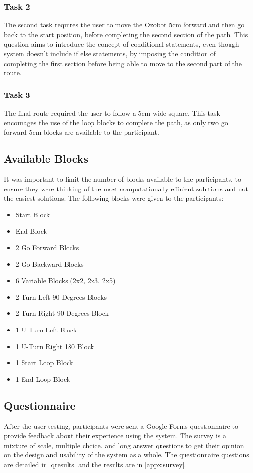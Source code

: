 \documentclass[oneside,%
                    author={Malak Hajji},
                    degree={BSc},
                    title={Designing An Accessible Ozobot Programming Platform for Students},
                  subtitle={With Mixed Visual Abilities}]{dissertation}
\begin{document}
\subsubsection{Task 2}
The second task requires the user to move the Ozobot 5cm forward and then go back to the start position, before completing the second section of the path. This question aims to introduce the concept of conditional statements, even though system doesn't include if else statements, by imposing the condition of completing the first section before being able to move to the second part of the route.
\subsubsection{Task 3}
The final route required the user to follow a 5cm wide square. This task encourages the use of the loop blocks to complete the path, as only two go forward 5cm blocks are available to the participant.
\subsection{Available Blocks}
It was important to limit the number of blocks available to the participants, to ensure they were thinking of the most computationally efficient solutions and not the easiest solutions. 
The following blocks were given to the participants:
\begin{itemize}
    \item  Start Block
    \item End Block
    \item 2 Go Forward Blocks
    \item 2 Go Backward Blocks
    \item 6 Variable Blocks (2x2, 2x3, 2x5)
    \item 2 Turn Left 90 Degrees Blocks
    \item 2 Turn Right 90 Degrees Block
    \item 1 U-Turn Left Block
    \item 1 U-Turn Right 180 Block
    \item 1 Start Loop Block
    \item 1 End Loop Block
\end{itemize}

\subsection{Questionnaire}
After the user testing, participants were sent a Google Forms questionnaire to provide feedback about their experience using the system. The survey is a mixture of scale, multiple choice, and long answer questions to get their opinion on the design and usability of the system as a whole. The questionnaire questions are detailed in \ref{qresults} and the results are in \ref{appx:survey}.
\end{document}
